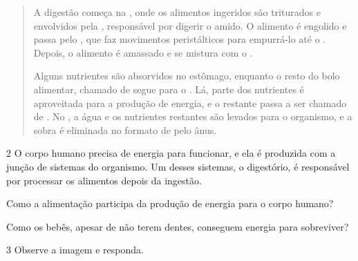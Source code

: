 \begin{quote}
A digestão começa na \preencher\preencher{}, onde os alimentos ingeridos são
triturados e envolvidos pela \preencher\preencher{}, responsável por digerir
o amido. O alimento é engolido e passa pelo \preencher\preencher{}, que faz
movimentos peristálticos para empurrá-lo até o \preencher\preencher{}.
Depois, o alimento é amassado e se mistura com o \preencher\preencher\preencher\preencher{}.

Alguns nutrientes são absorvidos no estômago, enquanto o resto do bolo
alimentar, chamado de \preencher\preencher{} segue para o \preencher\preencher{}. Lá, parte dos nutrientes é aproveitada para a produção de
energia, e o restante passa a ser chamado de \preencher\preencher{}. No \preencher\preencher{}, a água e os nutrientes restantes são levados para o
organismo, e a sobra é eliminada no formato de \preencher\preencher{} pelo
ânus.
\end{quote}

\num{2} O corpo humano precisa de energia para funcionar, e ela é
produzida com a junção de sistemas do organismo. Um desses sistemas, o
digestório, é responsável por processar os alimentos depois da ingestão.

\begin{escolha}
\item Como a alimentação participa da produção de energia para o corpo humano?



\item Como os bebês, apesar de não terem dentes, conseguem energia para
sobreviver?


\end{escolha}

\num{3} Observe a imagem e responda.

